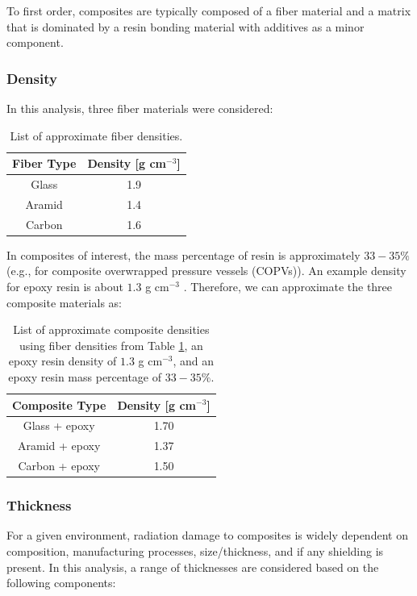\documentclass{hitec}
\begin{document}
To first order, composites are typically composed of a fiber material and a matrix that is dominated by a resin bonding material with additives as a minor component.

\subsubsection{Density}
In this analysis, three fiber materials were considered:


\begin{table}[h]\centering
	\caption{List of approximate fiber densities.}\label{tab:fiber_dens}
	\begin{tabular}{|c | c |}\hline
		Fiber Type & Density [g cm$^{-3}$] \\\hline
		Glass	& 1.9 \\\hline
		Aramid	& 1.4 \\\hline
		Carbon	& 1.6 \\\hline	
	\end{tabular}
\end{table}

In composites of interest, the mass percentage of resin is approximately $33-35\%$ (e.g., for composite overwrapped pressure vessels (COPVs)). An example density for epoxy resin is about $1.3$ g cm$^{-3}$ \citep{joven2013characterization}. Therefore, we can approximate the three composite materials as:

\begin{table}[h]\centering
	\caption{List of approximate composite densities using fiber densities from Table \ref{tab:fiber_dens}, an epoxy resin density of $1.3$ g cm$^{-3}$, and an epoxy resin mass percentage of $33-35\%$.}\label{tab:comp_dens}
	\begin{tabular}{|c | c |}\hline
		Composite Type & Density [g cm$^{-3}$] \\\hline
		Glass + epoxy	& 1.70 \\\hline
		Aramid + epoxy	& 1.37 \\\hline
		Carbon + epoxy	& 1.50 \\\hline	
	\end{tabular}
\end{table}

\subsubsection{Thickness}
For a given environment, radiation damage to composites is widely dependent on composition, manufacturing processes, size/thickness, and if any shielding is present. In this analysis, a range of thicknesses are considered based on the following components:
\end{document}
